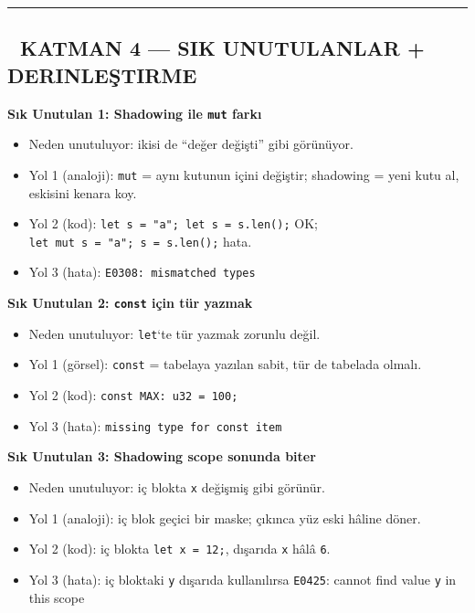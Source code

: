 \documentclass[12pt,a4paper]{article}
\begin{document}
\begin{center}\rule{0.5\linewidth}{0.5pt}\end{center}

\subsection{🔴 KATMAN 4 --- SIK UNUTULANLAR + DERINLEŞTIRME}\label{katman-4-—-sik-unutulanlar-derinleştirme-2}

\textbf{Sık Unutulan 1: Shadowing ile \texttt{mut} farkı}

\begin{itemize}
\tightlist
\item
  Neden unutuluyor: ikisi de ``değer değişti'' gibi görünüyor.
\item
  Yol 1 (analoji): \texttt{mut} = aynı kutunun içini değiştir; shadowing = yeni kutu al, eskisini kenara koy.
\item
  Yol 2 (kod): \texttt{let\ s\ =\ "a";\ let\ s\ =\ s.len();} OK; \texttt{let\ mut\ s\ =\ "a";\ s\ =\ s.len();} hata.
\item
  Yol 3 (hata): \texttt{E0308:\ mismatched\ types}
\end{itemize}

\textbf{Sık Unutulan 2: \texttt{const} için tür yazmak}

\begin{itemize}
\tightlist
\item
  Neden unutuluyor: \texttt{let}`te tür yazmak zorunlu değil.
\item
  Yol 1 (görsel): \texttt{const} = tabelaya yazılan sabit, tür de tabelada olmalı.
\item
  Yol 2 (kod): \texttt{const\ MAX:\ u32\ =\ 100;}
\item
  Yol 3 (hata): \texttt{missing\ type\ for\ const\ item}
\end{itemize}

\textbf{Sık Unutulan 3: Shadowing scope sonunda biter}

\begin{itemize}
\tightlist
\item
  Neden unutuluyor: iç blokta \texttt{x} değişmiş gibi görünür.
\item
  Yol 1 (analoji): iç blok geçici bir maske; çıkınca yüz eski hâline döner.
\item
  Yol 2 (kod): iç blokta \texttt{let\ x\ =\ 12;}, dışarıda \texttt{x} hâlâ \texttt{6}.
\item
  Yol 3 (hata): iç bloktaki \texttt{y} dışarıda kullanılırsa \texttt{E0425}: cannot find value \texttt{y} in this scope
\end{itemize}
\end{document}

